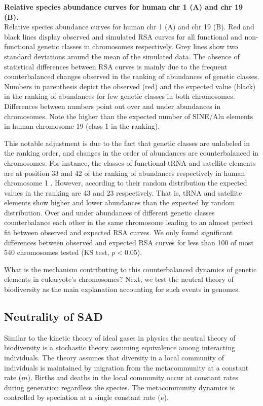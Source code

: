 \begin{FPfigure}
\caption[Relative species abundance curves for human chr 1 and chr 19]{{\bf Relative species abundance curves for human chr 1 (A) and chr 19 (B).} \\ Relative species abundance curves for human chr 1 (A) and chr 19 (B). Red and black lines display observed and simulated RSA curves for all functional and non-functional genetic classes in chromosomes respectively. Grey lines show two standard deviations around the mean of the simulated data. The absence of statistical differences between RSA curves is mainly due to the frequent counterbalanced changes observed in the ranking of abundances of genetic classes. Numbers in parenthesis depict the observed (red) and the expected value (black) in the ranking of abundances for few genetic classes in both chromosomes. Differences between numbers point out over and under abundances in chromosomes. Note the higher than the expected number of SINE/Alu elements in human chromosome 19 (class 1 in the ranking).} 
\label{fig:rsa_chromosomes}
\end{FPfigure}

This notable adjustment is due to the fact that genetic classes are unlabeled in the ranking order, and changes in the order of abundances are counterbalanced in chromosomes. For instance, the classes of functional tRNA and satellite elements are at position 33 and 42 of the ranking of abundances respectively in human chromosome 1 . However, according to their random distribution the expected values in the ranking are 43 and 23 respectively. That is, tRNA and satellite elements show higher and lower abundances than the expected by random distribution. Over and under abundances of different genetic classes counterbalance each other in the same chromosome leading to an almost perfect fit between observed and expected RSA curves. We only found significant differences between observed and expected RSA curves for less than 100 of most 540 chromosomes tested (KS test, $p < 0.05$).

What is the mechanism contributing to this counterbalanced dynamics of genetic elements in eukaryote's chromosomes? Next, we test the neutral theory of biodiversity as the main explanation accounting for such events in genomes.


\subsection{Neutrality of SAD}

Similar to the kinetic theory of ideal gases in physics the neutral theory of biodiversity is a stochastic theory assuming equivalence among interacting individuals. The theory assumes that diversity in a local community of individuals is maintained by migration from the metacommunity at a constant rate ($m$). Births and deaths in the local community occur at constant rates during generation regardless the species. The metacommunity dynamics is controlled by speciation at a single constant rate ($\nu$)\cite{Rosindell2011,Alonso2006}.

